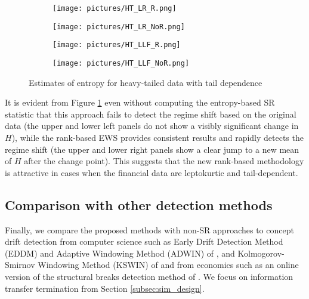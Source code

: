 \begin{figure}[H]
     \begin{subfigure}[b]{0.5\textwidth}
         \centering
         \texttt{[image: pictures/HT\_LR\_R.png]}
     \end{subfigure}
     \hfill
     \begin{subfigure}[b]{0.5\textwidth}
         \centering
         \texttt{[image: pictures/HT\_LR\_NoR.png]}

     \end{subfigure}
     \vfill
     \begin{subfigure}[b]{0.5\textwidth}
         \centering
         \texttt{[image: pictures/HT\_LLF\_R.png]}
     \end{subfigure}
    \hfill
     \begin{subfigure}[b]{0.5\textwidth}
         \centering
         \texttt{[image: pictures/HT\_LLF\_NoR.png]}     \end{subfigure}
        \caption{Estimates of entropy for heavy-tailed data with tail dependence}
        \label{fig:entropy_heavy_tailed)}
\end{figure}



It is evident from Figure \ref{fig:entropy_heavy_tailed)} even without computing the entropy-based SR statistic that this approach fails to detect the regime shift based on the original data (the upper and lower left panels do not show a visibly significant change in $H$), while the rank-based EWS provides consistent results and rapidly detects the regime shift (the upper and lower right panels show a clear jump to a new mean of $H$ after the change point). This suggests that the new rank-based methodology is attractive in cases when the financial data are leptokurtic and tail-dependent. 

\subsection{Comparison with other detection methods}

Finally, we compare the proposed methods with non-SR approaches to  concept drift detection from computer science such as Early Drift Detection Method (EDDM) and Adaptive Windowing Method (ADWIN) of \cite{Bifet}, and Kolmogorov-Smirnov Windowing Method (KSWIN) of \cite{Raab} and from economics such as an online version of the structural breaks detection method of \cite{Bai-Perron}.  We focus on information transfer termination from Section \ref{subsec:sim_design}. 

